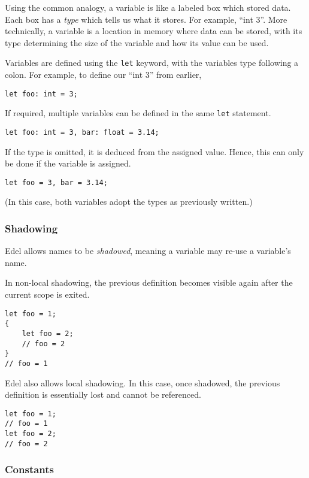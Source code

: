 \documentclass{article}
\begin{document}
    Using the common analogy, a variable is like a labeled box which stored data.
    Each box has a \textit{type} which tells us what it stores.
    For example, ``int 3''.
    More technically, a variable is a location in memory where data can be stored, with its type determining the size of the variable and how its value can be used.

    Variables are defined using the \texttt{let} keyword, with the variables type following a colon.
    For example, to define our ``int 3'' from earlier,
    \begin{lstlisting}[language=CustomLang]
let foo: int = 3;
    \end{lstlisting}

    If required, multiple variables can be defined in the same \texttt{let} statement.
    \begin{lstlisting}[language=CustomLang]
let foo: int = 3, bar: float = 3.14;
    \end{lstlisting}

    If the type is omitted, it is deduced from the assigned value.
    Hence, this can only be done if the variable is assigned.
    \begin{lstlisting}[language=CustomLang]
let foo = 3, bar = 3.14;
    \end{lstlisting}
    (In this case, both variables adopt the types as previously written.)

    \subsubsection{Shadowing}

    Edel allows names to be \textit{shadowed}, meaning a variable may re-use a variable's name.

    In non-local shadowing, the previous definition becomes visible again after the current scope is exited.
    \begin{lstlisting}[language=CustomLang]
let foo = 1;
{
    let foo = 2;
    // foo = 2
}
// foo = 1
    \end{lstlisting}

    Edel also allows local shadowing.
    In this case, once shadowed, the previous definition is essentially lost and cannot be referenced.
    \begin{lstlisting}[language=CustomLang]
let foo = 1;
// foo = 1
let foo = 2;
// foo = 2
    \end{lstlisting}

    \subsubsection{Constants}
\end{document}
